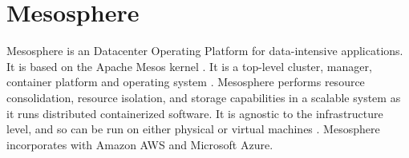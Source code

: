 \section{Mesosphere}

Mesosphere is an Datacenter Operating Platform for 
data-intensive applications. It is based on the Apache Mesos 
kernel \cite{hid-sp18-404-Concepts2018}. It is a top-level 
cluster, manager, container platform and operating system \cite{hid-sp18-404-Features2018}. 
Mesosphere performs resource consolidation, resource isolation, 
and storage capabilities in a scalable system as it runs distributed 
containerized software. It is agnostic to the infrastructure level, 
and so can be run on either physical or virtual machines \cite{hid-sp18-404-Architecture2018}. 
Mesosphere incorporates with Amazon AWS and Microsoft Azure.

